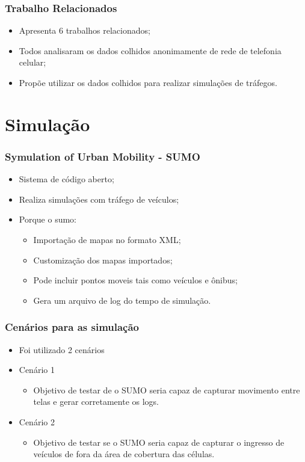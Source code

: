 \documentclass{beamer}
\begin{document}
\begin{frame}
	\frametitle{Trabalho Relacionados}
	\begin{itemize}
		\item Apresenta 6 trabalhos relacionados;
		\item Todos analisaram os dados colhidos anonimamente de rede de telefonia celular;
		\item Propõe utilizar os dados colhidos para realizar simulações de tráfegos.
	\end{itemize}
\end{frame}



\section{Simulação} 

\begin{frame}
	\frametitle{Symulation of Urban Mobility - SUMO}
	\begin{itemize}
		\item Sistema de código aberto;
		\item Realiza simulações com tráfego de veículos;
		\item Porque o sumo:
		\begin{itemize}
			\item Importação de mapas no formato XML;
			\item Customização dos mapas importados;
			\item Pode incluir pontos moveis tais como veículos e ônibus;
			\item Gera um arquivo de log do tempo de simulação.
		\end{itemize}
	\end{itemize}
\end{frame}


\begin{frame}
	\frametitle{Cenários para as simulação}
	\begin{itemize}
		\item Foi utilizado 2 cenários
		\item Cenário 1
		\begin{itemize}
			\item Objetivo de testar de o SUMO seria capaz de capturar movimento entre telas e gerar corretamente os logs.
		\end{itemize}
		\item Cenário 2
		\begin{itemize}
			\item Objetivo de testar se o SUMO seria capaz de capturar o ingresso de veículos de fora da área de cobertura das células.
		\end{itemize}
	\end{itemize}
\end{frame}
\end{document}
